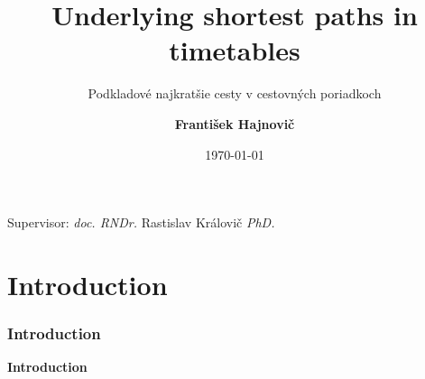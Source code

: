 \documentclass[]{beamer}
\title{\textbf{Underlying shortest paths in timetables}}
\subtitle{Podkladové najkratšie cesty v cestovných poriadkoch}
\author{\textbf{František Hajnovič}}
\institute{FMFI UK}
\date{\today}
\begin{document}
	{
    \begin{frame}
        \titlepage
        \begin{center}
            Supervisor: \textit{doc. RNDr.} Rastislav Královič \textit{PhD.}
        \end{center}
    \end{frame}
    }


    \section{Introduction}
    \begin{frame}
        \frametitle{Introduction}
        \begin{center}
            \textcolor{elcon-clr!80!black}{\textbf{Introduction}}
        \end{center}
    \end{frame}
\end{document}
